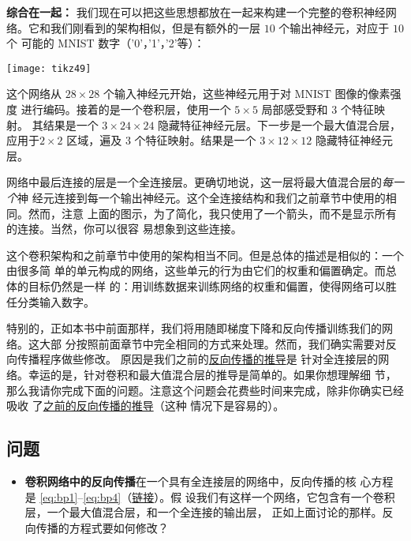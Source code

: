 \textbf{综合在一起：} 我们现在可以把这些思想都放在一起来构建一个完整的卷积神经网
络。它和我们刚看到的架构相似，但是有额外的一层 $10$ 个输出神经元，对应于 $10$ 个
可能的 MNIST 数字（'0'，'1'，'2'等）：
\begin{center}
  \texttt{[image: tikz49]}  
\end{center}

这个网络从 $28 \times 28$ 个输入神经元开始，这些神经元用于对 MNIST 图像的像素强度
进行编码。接着的是一个卷积层，使用一个 $5 \times 5$ 局部感受野和 $3$ 个特征映射。
其结果是一个 $3 \times 24 \times 24$ 隐藏特征神经元层。下一步是一个最大值混合层，
应用于$2 \times 2$ 区域，遍及 $3$ 个特征映射。结果是一个 $3 \times 12 \times 12$
隐藏特征神经元层。

网络中最后连接的层是一个全连接层。更确切地说，这一层将最大值混合层的\emph{每一个}神
经元连接到每一个输出神经元。这个全连接结构和我们之前章节中使用的相同。然而，注意
上面的图示，为了简化，我只使用了一个箭头，而不是显示所有的连接。当然，你可以很容
易想象到这些连接。

这个卷积架构和之前章节中使用的架构相当不同。但是总体的描述是相似的：一个由很多简
单的单元构成的网络，这些单元的行为由它们的权重和偏置确定。而总体的目标仍然是一样
的：用训练数据来训练网络的权重和偏置，使得网络可以胜任分类输入数字。

特别的，正如本书中前面那样，我们将用随即梯度下降和反向传播训练我们的网络。这大部
分按照前面章节中完全相同的方式来处理。然而，我们确实需要对反向传播程序做些修改。
原因是我们之前的\hyperref[ch:HowThebackpropagationalgorithmworks]{反向传播的推导}是
针对全连接层的网络。幸运的是，针对卷积和最大值混合层的推导是简单的。如果你想理解细
节，那么我请你完成下面的问题。注意这个问题会花费些时间来完成，除非你确实已经吸收
了\hyperref[ch:HowThebackpropagationalgorithmworks]{之前的反向传播的推导}（这种
  情况下是容易的）。

\subsection*{问题}

\begin{itemize}
\item \textbf{卷积网络中的反向传播}\quad 在一个具有全连接层的网络中，反向传播的核
  心方程是 \eqref{eq:bp1}--\eqref{eq:bp4}（\hyperref[backpropsummary]{链接}）。假
  设我们有这样一个网络，它包含有一个卷积层，一个最大值混合层，和一个全连接的输出层，
  正如上面讨论的那样。反向传播的方程式要如何修改？
\end{itemize}

